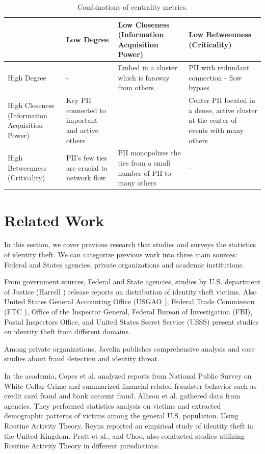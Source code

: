 \documentclass[conference]{IEEEtran}
\begin{document}
\begin{table}[t!]
\centering
\begin{tabular}{ |p{4cm}||p{4cm}|p{4cm}|p{4cm}|  }
 \hline
    & Low Degree & Low Closeness (Information Acquisition Power) & Low Betweenness (Criticality)\\
 \hline
 High Degree   & -    & Embed in a cluster which is faraway from others & PII with redundant connection - flow bypass \\
 \hline
 High Closeness (Information Acquisition Power) &   Key PII connected to important and active others  & -   & Center PII located  in  a  dense,  active cluster at the center of events with many others \\
 \hline
 High Betweenness (Criticality) & PII's few ties are crucial to network flow &  PII monopolizes
the ties from a small number of PII to many others  &  - \\
 \hline
\end{tabular}
\caption{Combinations of centrality metrics.}
\label{table:2}
\end{table}

\section{Related Work}

In this section, we cover previous research that studies and surveys the statistics of identity theft. We can categorize previous work into three main sources: Federal and States agencies, private organizations and academic institutions.

From government sources, Federal and State agencies, studies by U.S. department of Justice (Harrell \cite{Harrell}) release reports on distribution of identity theft victims. Also United States General Accounting Office (USGAO \cite{USGAO}), Federal Trade Commission (FTC \cite{FTC}), Office of the Inspector General, Federal Bureau of Investigation (FBI), Postal Inspectors Office, and United States Secret Service (USSS) present studies on identity theft from different domains. 

Among private organizations, Javelin \cite{Pascual} publishes comprehensive analysis and case studies about fraud detection and identity threat.

In the academia, Copes et al. \cite{Copes} analyzed reports from National Public Survey on White Collar Crime and summarized financial-related fraudster behavior such as credit card fraud and bank account fraud. Allison et al. \cite{Allison} gathered data from agencies. They performed statistics analysis on victims and extracted demographic patterns of victims among the general U.S. population. Using Routine Activity Theory, Reyns \cite{Reyns} reported an empirical study of identity theft in the United Kingdom. Pratt et al.\cite{Pratt}, and Choo, \cite{Choo} also conducted studies utilizing Routine Activity Theory in different jurisdictions. 
\end{document}
